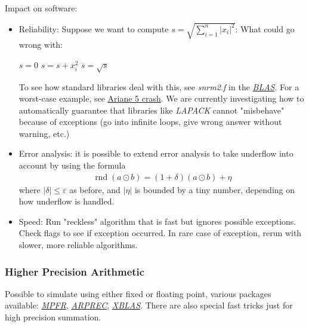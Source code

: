 \documentclass[11pt]{article}
\numberwithin{equation}{section}
\begin{document}
Impact on software: \begin{itemize}
    \item Reliability: Suppose we want to compute $s=\sqrt{\sum_{i=1}^{n}\left|x_{i}\right|^{2}}$: What could go wrong with:\begin{algorithmfrm}
        \begin{algorithmic}[1]
            \State $s=0$
                \State $s = s + x_i^2$
                \EndFor
            \State $s = \sqrt{s}$
        \end{algorithmic}
    \end{algorithmfrm}
    To see how standard libraries deal with this, see \textit{snrm2.f} in the \href{http://bebop.cs.berkeley.edu/reproblas}{\textit{BLAS}}.
    For a worst-case example, see \href{https://people.eecs.berkeley.edu/~demmel/ma221_Fall04/ariane5rep.html}{Ariane 5 crash}.
    We are currently investigating how to automatically guarantee that libraries like \textit{LAPACK} cannot "misbehave" because of exceptions 
    (go into infinite loops, give wrong answer without warning, etc.)
    \item Error analysis: it is possible to extend error analysis to take underflow into account by using the formula 
    \begin{align*}
        \operatorname{rnd}(a \odot b) = (1+\delta)(a \odot b) + \eta
    \end{align*}
    where $|\delta| \leq \varepsilon$ as before, and $|\eta|$ is bounded by a tiny number, depending on how underflow is handled.
    \item Speed: Run "reckless" algorithm that is fast but ignores possible exceptions. Check flags to see if exception occurred.
    In rare case of exception, rerun with slower, more reliable algorithms.
\end{itemize}

\subsubsection{Higher Precision Arithmetic}
Possible to simulate using either fixed or floating point, various packages available: 
\href{http://mpfr.org/}{\textit{MPFR}}, 
\href{http://crd.lbl.gov/~dhbailey/mpdist/index.html}{\textit{ARPREC}},
\href{http://www.netlib.org/xblas}{\textit{XBLAS}}. 
There are also special fast tricks just for high precision summation.
\end{document}
